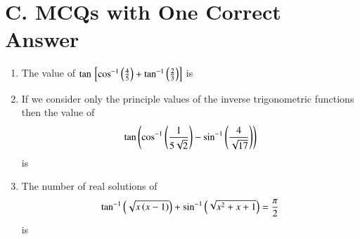 \documentclass[journal,12pt,twocolumn,article]{IEEEtran}
\theoremstyle{remark}
\begin{document}
\section*{C. MCQs with One Correct Answer}
\begin{enumerate}
\item The value of $\tan {}\left[ \cos ^{-1}\left(\frac{4}{5}\right)+\tan^{-1}\left(\frac{2}{3}\right) \right]$ is
\hfill {}
\begin{enumerate}
\end{enumerate}
\item If we consider only the principle values of the inverse trigonometric functions then the value of
\begin{align*}
\tan \left(\cos ^{-1}\left(\frac{1}{5\sqrt{2}}\right)-\sin ^{-1}\left(\frac{4}{\sqrt{17}}\right)\right)
\end{align*}
is
\hfill {}
\begin{enumerate}
\end{enumerate}
\item The number of real solutions of
\begin{align*}
\tan ^{-1}\left(\sqrt{x\left(x-1\right)}\right)+\sin ^{-1}\left(\sqrt{x^2+x+1}\right)=\frac{\pi}{2}
\end{align*}
is 
\hfill {}
\begin{enumerate}

\end{enumerate}
\end{enumerate}
\end{document}
